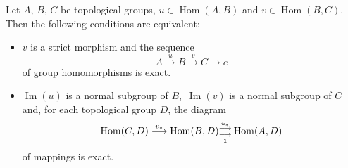 \documentclass[10pt,a4paper]{amsart}
\def\Hom{\operatorname{{Hom}}}
\def\mI{\operatorname{{Im}}}
\begin{document}
\begin{theorem}\label{Theorem3.4}
Let $A$, $B$, $C$ be topological groups, $u \in \Hom(A,B)$ and
$v \in \Hom(B,C)$. Then the following conditions are equivalent:

\begin{itemize}

\item[\rm (a)] $v$ is a strict morphism and the sequence
  $$
  A \overset{u}{\longrightarrow} B \overset{v}{\longrightarrow} C \longrightarrow e
  $$
  of group homomorphisms is exact.

\item[\rm (b)] $\mI(u)$ is a normal subgroup of $B$,\, $\mI(v)$ is a normal
  subgroup of $C$ and, for each topological group $D$, the diagram
  $$
  \Hom(C,D)\overset{v_*}{\longrightarrow}\Hom(B,D)^{\overset{u_*}{\longrightarrow}}_{\underset{\bf 1}{\longrightarrow}} \Hom(A,D)
  $$
  of mappings is exact.

\end{itemize}
\end{theorem}
\end{document}
